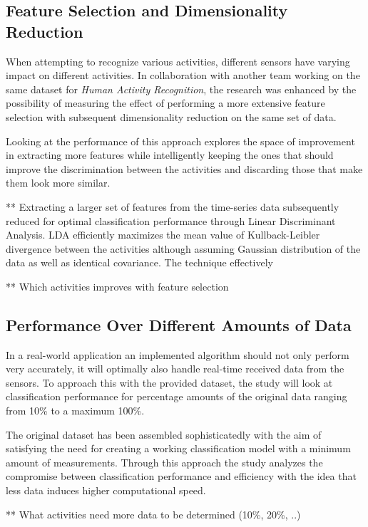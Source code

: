\documentclass{sig-alternate}
\begin{document}
\subsection{Feature Selection and Dimensionality Reduction}
When attempting to recognize various activities, different sensors have varying impact on different activities. In collaboration with another team working on the same dataset for \textit{Human Activity Recognition}, the research was enhanced by the possibility of measuring the effect of performing a more extensive feature selection with subsequent dimensionality reduction on the same set of data. 

Looking at the performance of this approach explores the space of improvement in extracting more features while intelligently keeping the ones that should improve the discrimination between the activities and discarding those that make them look more similar.

** Extracting a larger set of features from the time-series data subsequently reduced for optimal classification performance through Linear Discriminant Analysis. LDA efficiently maximizes the mean value of Kullback-Leibler divergence between the activities although assuming Gaussian distribution of the data as well as identical covariance. The technique effectively

** Which activities improves with feature selection

\subsection{Performance Over Different Amounts of Data}
In a real-world application an implemented algorithm should not only perform very accurately, it will optimally also handle real-time received data from the sensors. To approach this with the provided dataset, the study will look at classification performance for percentage amounts of the original data ranging from 10\% to a maximum 100\%.

The original dataset has been assembled sophisticatedly with the aim of satisfying the need for creating a working classification model with a minimum amount of measurements. Through this approach the study analyzes the compromise between classification performance and efficiency with the idea that less data induces higher computational speed.

** What activities need more data to be determined (10\%, 20\%, ..)

\end{document}
